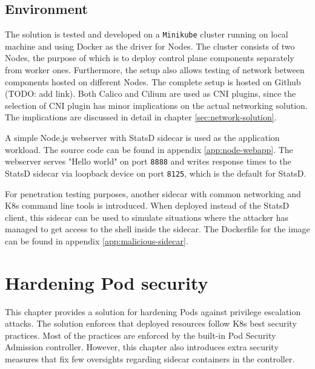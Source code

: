\documentclass[english, 12pt, a4paper, sci, utf8, a-2b, online]{aaltothesis}
\begin{document}

\subsection{Environment}

The solution is tested and developed on a \texttt{Minikube} cluster running on local machine and using Docker as the driver for Nodes. The cluster consists of two Nodes, the purpose of which is to deploy control plane components separately from worker ones. Furthermore, the setup also allows testing of network between components hosted on different Nodes. The complete setup is hosted on Github (TODO: add link). Both Calico and Cilium are used as CNI plugins, since the selection of CNI plugin has minor implications on the actual networking solution. The implications are discussed in detail in chapter \ref{sec:network-solution}.

A simple Node.js webserver with StatsD sidecar is used as the application workload. The source code can be found in appendix \ref{app:node-webapp}. The webserver serves "Hello world" on port \texttt{8888} and writes response times to the StatsD sidecar via loopback device on port \texttt{8125}, which is the default for StatsD.

For penetration testing purposes, another sidecar with common networking and K8s command line tools is introduced. When deployed instead of the StatsD client, this sidecar can be used to simulate situations where the attacker has managed to get access to the shell inside the sidecar. The Dockerfile for the image can be found in appendix \ref{app:malicious-sidecar}.

\clearpage

\section{Hardening Pod security} \label{sec:pod-hardening}

This chapter provides a solution for hardening Pods against privilege escalation attacks. The solution enforces that deployed resources follow K8s best security practices. Most of the practices are enforced by the built-in Pod Security Admission controller. However, this chapter also introduces extra security measures that fix few oversights regarding sidecar containers in the controller.

\end{document}
